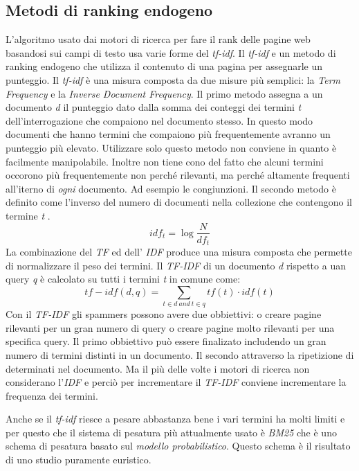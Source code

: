 \subsection{Metodi di ranking endogeno}
L'algoritmo usato dai motori di ricerca per fare il rank delle pagine web basandosi sui campi di testo usa varie forme del \textit{tf-idf}. Il \textit{tf-idf} e un metodo di ranking endogeno che utilizza il contenuto di una pagina per assegnarle un punteggio. Il \textit{tf-idf} è una misura composta da due misure più semplici: la \textit{Term Frequency} e la \textit{Inverse Document Frequency}. Il primo metodo assegna a un documento \textit{d} il punteggio dato dalla somma dei conteggi dei termini \textit{t} dell'interrogazione che compaiono nel documento stesso. In questo modo documenti che hanno termini che compaiono più frequentemente avranno un punteggio più elevato. Utilizzare solo questo metodo non conviene in quanto è facilmente manipolabile. Inoltre non tiene cono del fatto che alcuni termini occorono più frequentemente non perché rilevanti, ma perché altamente frequenti all'iterno di \textit{ogni} documento. Ad esempio le congiunzioni. Il secondo metodo è definito come l'inverso del numero di 
documenti nella collezione che contengono il termine \textit{t} \cite{Manning:2008:IIR:1394399p117}.
\begin{equation}
 idf_t=\log\frac{N}{df_t}
 \label{eq:idf}
\end{equation}
La combinazione del \textit{TF} ed dell' \textit{IDF} produce una misura composta che permette di normalizzare il peso dei termini. Il \textit{TF-IDF} di un documento \textit{d} rispetto a uan query \textit{q} è calcolato su tutti i termini \textit{t} in comune come:
\begin{equation}
 tf-idf(d,q)=\sum_{t \in d \: and \: t \in q} tf(t) \cdot idf(t)
\end{equation}
Con il \textit{TF-IDF} gli spammers possono avere due obbiettivi: o creare pagine rilevanti per un gran numero di query o creare pagine molto rilevanti per una specifica query. Il primo obbiettivo può essere finalizato includendo un gran numero di termini distinti in un documento. Il secondo attraverso la ripetizione di determinati nel documento. Ma il più delle volte i motori di ricerca non considerano l'\textit{IDF} e perciò per incrementare il \textit{TF-IDF} conviene incrementare la frequenza dei termini.

Anche se il \textit{tf-idf} riesce a pesare abbastanza bene i vari termini ha molti limiti e per questo che il sistema di pesatura più attualmente usato è \textit{BM25} che è uno schema di pesatura basato sul \textit{modello probabilistico}. Questo schema è il risultato di uno studio puramente euristico.

